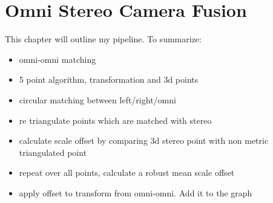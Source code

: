 \chapter{Omni Stereo Camera Fusion}
\label{chapter:omni_stereo_fusion}

This chapter will outline my pipeline.  To summarize:

\begin{itemize}
\itemsep0em
 \item omni-omni matching
 \item 5 point algorithm, transformation and 3d points
 \item circular matching between left/right/omni
 \item re triangulate points which are matched with stereo
 \item calculate scale offset by comparing 3d stereo point with non metric triangulated point
 \item repeat over all points, calculate a robust mean scale offset
 \item apply offset to transform from omni-omni. Add it to the graph
\end{itemize}


